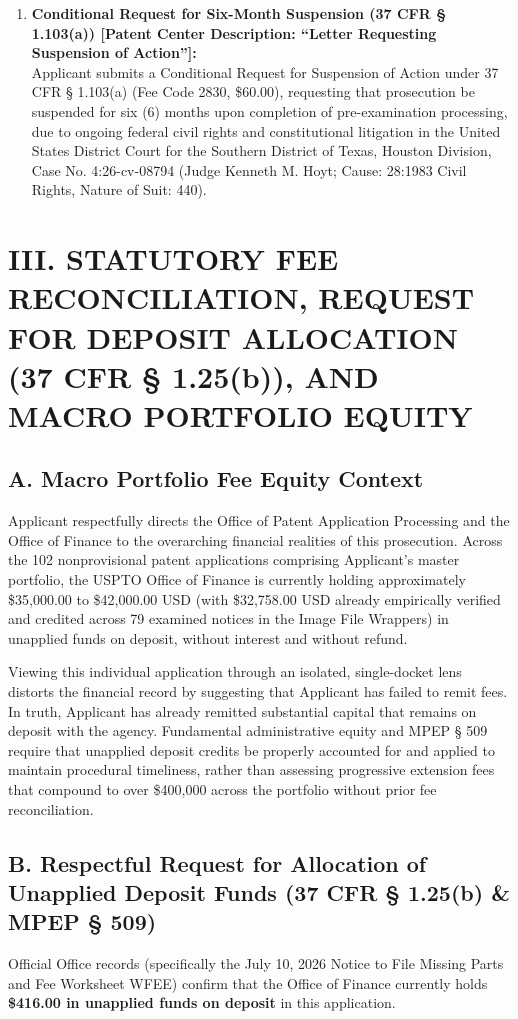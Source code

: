\documentclass[11pt,letterpaper]{article}
\begin{document}
\begin{enumerate}[leftmargin=*]
    \item \textbf{Conditional Request for Six-Month Suspension (37 CFR \S{} 1.103(a)) [Patent Center Description: ``Letter Requesting Suspension of Action'']:} \\
    Applicant submits a Conditional Request for Suspension of Action under 37 CFR \S{} 1.103(a) (Fee Code 2830, \$60.00), requesting that prosecution be suspended for six (6) months upon completion of pre-examination processing, due to ongoing federal civil rights and constitutional litigation in the United States District Court for the Southern District of Texas, Houston Division, Case No. 4:26-cv-08794 (Judge Kenneth M. Hoyt; Cause: 28:1983 Civil Rights, Nature of Suit: 440).
\end{enumerate}

\section*{III. STATUTORY FEE RECONCILIATION, REQUEST FOR DEPOSIT ALLOCATION (37 CFR \S{} 1.25(b)), AND MACRO PORTFOLIO EQUITY}

\subsection*{A. Macro Portfolio Fee Equity Context}
Applicant respectfully directs the Office of Patent Application Processing and the Office of Finance to the overarching financial realities of this prosecution. Across the 102 nonprovisional patent applications comprising Applicant's master portfolio, the USPTO Office of Finance is currently holding approximately \$35,000.00 to \$42,000.00 USD (with \$32,758.00 USD already empirically verified and credited across 79 examined notices in the Image File Wrappers) in unapplied funds on deposit, without interest and without refund.

Viewing this individual application through an isolated, single-docket lens distorts the financial record by suggesting that Applicant has failed to remit fees. In truth, Applicant has already remitted substantial capital that remains on deposit with the agency. Fundamental administrative equity and MPEP \S{} 509 require that unapplied deposit credits be properly accounted for and applied to maintain procedural timeliness, rather than assessing progressive extension fees that compound to over \$400,000 across the portfolio without prior fee reconciliation.

\subsection*{B. Respectful Request for Allocation of Unapplied Deposit Funds (37 CFR \S{} 1.25(b) \& MPEP \S{} 509)}
Official Office records (specifically the July 10, 2026 Notice to File Missing Parts and Fee Worksheet WFEE) confirm that the Office of Finance currently holds \textbf{\$416.00 in unapplied funds on deposit} in this application.
\end{document}

